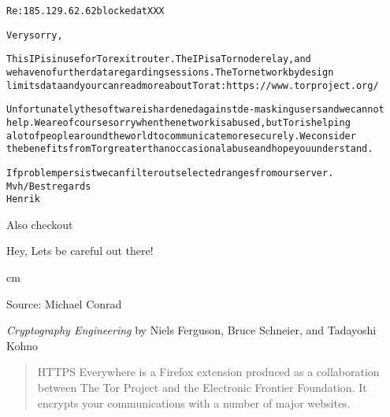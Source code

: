 \documentclass[20pt,landscape,a4paper,footrule]{foils}
\begin{document}

\begin{alltt}\small
Re: 185.129.62.62 blocked at XXX

Very sorry,

This IP is in use for Tor exit router. The IP is a Tor node relay, and
we have no further data regarding sessions. The Tor network by design
limits data and your can read more about Tor at: https://www.torproject.org/

Unfortunately the software is hardened against de-masking users and we cannot
help. We are of course sorry when the network is abused, but Tor is helping
a lot of people around the world to communicate more securely. We consider
the benefits from Tor greater than occasional abuse and hope you understand.

If problem persist we can filter out selected ranges from our server.
Mvh/Best regards
Henrik
\end{alltt}

Also checkout 


\centerline{\Large Hey, Lets be careful out there!}
 cm

\begin{center}
\myname

\end{center}

\vskip 2cm
Source: Michael Conrad 



\emph{Cryptography Engineering} by
Niels Ferguson, Bruce Schneier, and Tadayoshi Kohno




\begin{quote}
HTTPS Everywhere is a Firefox extension produced as a collaboration between The Tor Project and the Electronic Frontier Foundation. It encrypts your communications with a number of major websites.
\end{quote}

\centerline{}
\end{document}
